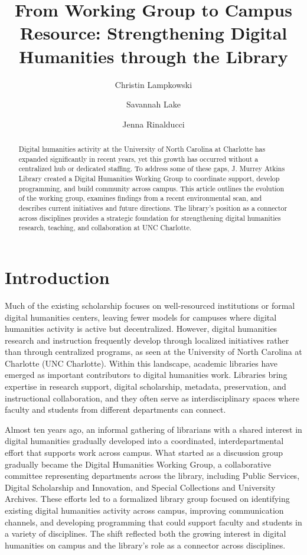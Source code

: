 \documentclass[final]{anthology-ch}
\title{From Working Group to Campus Resource: Strengthening Digital Humanities through the Library}
\author[1]{Christin Lampkowski}[
  orcid=0009-0005-6929-1891
]
\author[1]{Savannah Lake}[
  orcid=0000-0001-9998-5185
]
\author[1]{Jenna Rinalducci}[
  orcid=0000-0002-7607-5653
]
\affiliation{1}{University of North Carolina at Charlotte, Charlotte, NC, USA}
\begin{document}
\maketitle

\begin{abstract}
Digital humanities activity at the University of North Carolina at Charlotte has expanded significantly in recent years, yet this growth has occurred without a centralized hub or dedicated staffing. To address some of these gaps, J. Murrey Atkins Library created a Digital Humanities Working Group to coordinate support, develop programming, and build community across campus. This article outlines the evolution of the working group, examines findings from a recent environmental scan, and describes current initiatives and future directions. The library's position as a connector across disciplines provides a strategic foundation for strengthening digital humanities research, teaching, and collaboration at UNC Charlotte.
\end{abstract}

\section{Introduction} \label{sec:intro}

Much of the existing scholarship focuses on well-resourced institutions or formal digital humanities centers, leaving fewer models for campuses where digital humanities activity is active but decentralized. However, digital humanities research and instruction frequently develop through localized initiatives rather than through centralized programs, as seen at the University of North Carolina at Charlotte (UNC Charlotte). Within this landscape, academic libraries have emerged as important contributors to digital humanities work. Libraries bring expertise in research support, digital scholarship, metadata, preservation, and instructional collaboration, and they often serve as interdisciplinary spaces where faculty and students from different departments can connect.

Almost ten years ago, an informal gathering of librarians with a shared interest in digital humanities gradually developed into a coordinated, interdepartmental effort that supports work across campus. What started as a discussion group gradually became the Digital Humanities Working Group, a collaborative committee representing departments across the library, including Public Services, Digital Scholarship and Innovation, and Special Collections and University Archives. These efforts led to a formalized library group focused on identifying existing digital humanities activity across campus, improving communication channels, and developing programming that could support faculty and students in a variety of disciplines. The shift reflected both the growing interest in digital humanities on campus and the library's role as a connector across disciplines.
\end{document}
